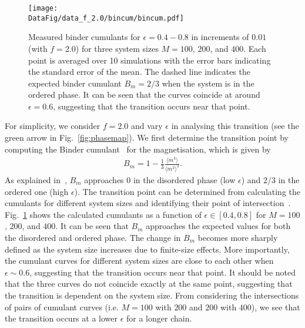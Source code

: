 \documentclass[12pt]{article}
\newcommand*{\DataFig}{/Users/MichaelChiang/Desktop/epigenetics_data/}
\begin{document}
\begin{figure}[t]
\centering
\texttt{[image: \\DataFig/data\_f\_2.0/bincum/bincum.pdf]}
\caption{Measured binder cumulants for $\epsilon = 0.4 - 0.8$ in increments of $0.01$ (with $f = 2.0$) for three system sizes $M = 100$, $200$, and $400$. Each point is averaged over 10 simulations with the error bars indicating the standard error of the mean. The dashed line indicates the expected binder cumulant $B_m = 2/3$ when the system is in the ordered phase. It can be seen that the curves coincide at around $\epsilon = 0.6$, suggesting that the transition occurs near that point.}
\label{fig:bincum}
\end{figure}
For simplicity, we consider $f = 2.0$ and vary $\epsilon$ in analysing this transition (see the green arrow in Fig.~\ref{fig:phasemap}). We first determine the transition point by computing the Binder cumulant~\cite{binder1981} for the magnetisation, which is given by
\begin{eqnarray}
B_m = 1 - \frac{1}{3}\frac{\langle m^4 \rangle}{\langle m^2 \rangle^2}.
\end{eqnarray}
As explained in~\cite{binder1981}, $B_m$ approaches $0$ in the disordered phase (low $\epsilon$) and $2/3$ in the ordered one (high $\epsilon$). The transition point can be determined from calculating the cumulants for different system sizes and identifying their point of intersection~\cite{binder2010}. Fig.~\ref{fig:bincum} shows the calculated cumulants as a function of $\epsilon \in [0.4,0.8]$ for $M = 100$, $200$, and $400$. It can be seen that $B_m$ approaches the expected values for both the disordered and ordered phase. The change in $B_m$ becomes more sharply defined as the system size increases due to finite-size effects. More importantly, the cumulant curves for different system sizes are close to each other when $\epsilon \sim 0.6$, suggesting that the transition occurs near that point. It should be noted that the three curves do not coincide exactly at the same point, suggesting that the transition is dependent on the system size. From considering the intersections of pairs of cumulant curves (i.e. $M = 100$ with $200$ and $200$ with $400$), we see that the transition occurs at a lower $\epsilon$ for a longer chain.
\end{document}
